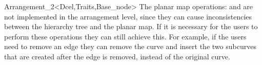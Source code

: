 \begin{ccRefClass}{Arrangement_2<Dcel,Traits,Base_node>}
    The planar map operations:  and  are
    not implemented in the arrangement level,
    since they can cause inconsistencies
    between the hierarchy tree and the planar map.
    If it is necessary for the users to perform these operations
    they can still achieve this. For example, if the users need to remove an
    edge they can remove the curve and insert the two subcurves that are
    created after the edge is removed,
    instead of the original curve.

\end{ccRefClass}


\ccRefPageEnd
